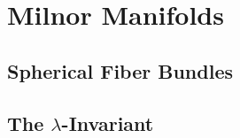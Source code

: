 \chapter{Milnor Manifolds}

\section{Spherical Fiber Bundles}

\section{The \texorpdfstring{$\lambda$}{λ}-Invariant}
